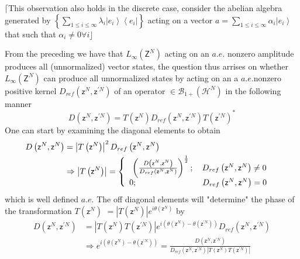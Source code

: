 \documentclass[aps,preprint]{revtex4}%
\begin{document}
$\lceil$This observation also holds in the discrete case, consider the abelian
algebra generated by $\left\{
{\textstyle\sum\limits_{1\leq i\leq\infty}}
\lambda_{i}\left\vert e_{i}\right\rangle \left\langle e_{i}\right\vert
\right\}  $ acting on a vector $a=%
{\textstyle\sum\limits_{1\leq i\leq\infty}}
\alpha_{i}\left\vert e_{i}\right\rangle $ that such that $\alpha_{i}%
\neq0\forall i\rfloor$

From the preceding we have that $L_{\infty}\left(  \mathsf{Z}^{N}\right)  $
acting on an $a.e.$ nonzero amplitude produces all (unnormalized) vector
states, the question thus arrises on whether $L_{\infty}\left(  \mathsf{Z}%
^{N}\right)  $ can produce all unnormalized states by acting on an a
$a.e.$nonzero positive kernel $D_{ref}\left(  \mathsf{z}^{N},\mathsf{z}%
^{\prime N}\right)  $ of an operator $\in\mathcal{B}_{1+}\left(
\mathcal{H}^{N}\right)  $ in the following manner%
\begin{equation}
D\left(  \mathsf{z}^{N},\mathsf{z}^{\prime N}\right)  =T\left(  \mathsf{z}%
^{N}\right)  D_{ref}\left(  \mathsf{z}^{N},\mathsf{z}^{\prime N}\right)
T\left(  \mathsf{z}^{\prime N}\right)  ^{\ast}%
\end{equation}
One can start by examining the diagonal elements to obtain
\begin{align}
D\left(  \mathsf{z}^{N},\mathsf{z}^{N}\right)   &  =\left\vert T\left(
\mathsf{z}^{N}\right)  \right\vert ^{2}D_{ref}\left(  \mathsf{z}%
^{N},\mathsf{z}^{N}\right) \nonumber\\
&  \Rightarrow\left\vert T\left(  \mathsf{z}^{N}\right)  \right\vert =\left\{
%
\begin{array}
[c]{c}%
\left(  \frac{D\left(  \mathsf{z}^{N},\mathsf{z}^{N}\right)  }{D_{ref}\left(
\mathsf{z}^{N},\mathsf{z}^{N}\right)  }\right)  ^{\frac{1}{2}};\quad
D_{ref}\left(  \mathsf{z}^{N},\mathsf{z}^{N}\right)  \neq0\\
0;\qquad\qquad\qquad\quad\quad D_{ref}\left(  \mathsf{z}^{N},\mathsf{z}%
^{N}\right)  =0\text{ }%
\end{array}
\right.  \text{ }%
\end{align}
which is well defined $a.e.$ The off diagonal elements will "determine" the
phase of the transformation $T\left(  \mathsf{z}^{N}\right)  $ $=\left\vert
T\left(  \mathsf{z}^{N}\right)  \right\vert e^{i\theta\left(  \mathsf{z}%
^{N}\right)  }$ by
\begin{align}
D\left(  \mathsf{z}^{N},\mathsf{z}^{\prime N}\right)   &  =\left\vert T\left(
\mathsf{z}^{N}\right)  T\left(  \mathsf{z}^{\prime N}\right)  \right\vert
e^{i\left(  \theta\left(  \mathsf{z}^{N}\right)  -\theta\left(  \mathsf{z}%
^{\prime N}\right)  \right)  }D_{ref}\left(  \mathsf{z}^{N},\mathsf{z}^{\prime
N}\right) \nonumber\\
&  \Rightarrow e^{i\left(  \theta\left(  \mathsf{z}^{N}\right)  -\theta\left(
\mathsf{z}^{\prime N}\right)  \right)  }=\frac{D\left(  \mathsf{z}%
^{N},\mathsf{z}^{\prime N}\right)  }{D_{ref}\left(  \mathsf{z}^{N}%
,\mathsf{z}^{\prime N}\right)  \left\vert T\left(  \mathsf{z}^{N}\right)
T\left(  \mathsf{z}^{\prime N}\right)  \right\vert }%
\end{align}
\end{document}
